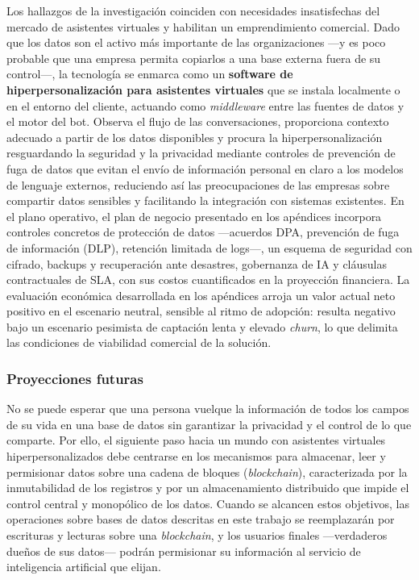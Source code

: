 Los hallazgos de la investigación coinciden con necesidades insatisfechas del mercado de asistentes virtuales y habilitan un emprendimiento comercial. Dado que los datos son el activo más importante de las organizaciones —y es poco probable que una empresa permita copiarlos a una base externa fuera de su control—, la tecnología se enmarca como un \textbf{software de hiperpersonalización para asistentes virtuales} que se instala localmente o en el entorno del cliente, actuando como \textit{middleware} entre las fuentes de datos y el motor del bot. Observa el flujo de las conversaciones, proporciona contexto adecuado a partir de los datos disponibles y procura la hiperpersonalización resguardando la seguridad y la privacidad mediante controles de prevención de fuga de datos que evitan el envío de información personal en claro a los modelos de lenguaje externos, reduciendo así las preocupaciones de las empresas sobre compartir datos sensibles y facilitando la integración con sistemas existentes. En el plano operativo, el plan de negocio presentado en los apéndices incorpora controles concretos de protección de datos —acuerdos DPA, prevención de fuga de información (DLP), retención limitada de logs—, un esquema de seguridad con cifrado, backups y recuperación ante desastres, gobernanza de IA y cláusulas contractuales de SLA, con sus costos cuantificados en la proyección financiera. La evaluación económica desarrollada en los apéndices arroja un valor actual neto positivo en el escenario neutral, sensible al ritmo de adopción: resulta negativo bajo un escenario pesimista de captación lenta y elevado \textit{churn}, lo que delimita las condiciones de viabilidad comercial de la solución.

\subsubsection{Proyecciones futuras}

No se puede esperar que una persona vuelque la información de todos los campos de su vida en una base de datos sin garantizar la privacidad y el control de lo que comparte. Por ello, el siguiente paso hacia un mundo con asistentes virtuales hiperpersonalizados debe centrarse en los mecanismos para almacenar, leer y permisionar datos sobre una cadena de bloques (\textit{blockchain}), caracterizada por la inmutabilidad de los registros y por un almacenamiento distribuido que impide el control central y monopólico de los datos. Cuando se alcancen estos objetivos, las operaciones sobre bases de datos descritas en este trabajo se reemplazarán por escrituras y lecturas sobre una \textit{blockchain}, y los usuarios finales —verdaderos dueños de sus datos— podrán permisionar su información al servicio de inteligencia artificial que elijan.

